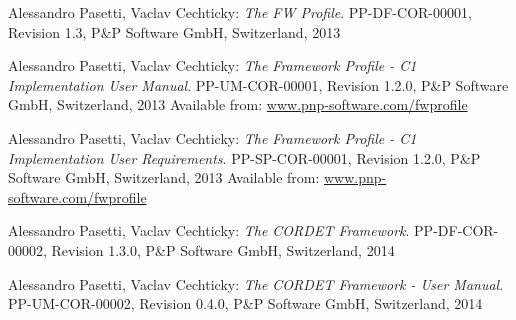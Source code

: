 \documentclass[a4paper,10pt]{article}
\begin{document}
\clearpage

\begin{thebibliography}{6}
 
 Alessandro Pasetti, Vaclav Cechticky:
           {\sl The FW Profile}. PP-DF-COR-00001, Revision 1.3,
           P\&P Software GmbH, Switzerland, 2013 

 Alessandro Pasetti, Vaclav Cechticky:
           {\sl The Framework Profile - C1 Implementation User Manual}. 
           PP-UM-COR-00001, Revision 1.2.0,
           P\&P Software GmbH, Switzerland, 2013
		   Available from: \url{www.pnp-software.com/fwprofile}          
		   
 Alessandro Pasetti, Vaclav Cechticky:
           {\sl The Framework Profile - C1 Implementation User Requirements}. 
           PP-SP-COR-00001, Revision 1.2.0,
           P\&P Software GmbH, Switzerland, 2013
		   Available from: \url{www.pnp-software.com/fwprofile}          		     
           
 Alessandro Pasetti, Vaclav Cechticky:
           {\sl The CORDET Framework}. 
           PP-DF-COR-00002, Revision 1.3.0,
           P\&P Software GmbH, Switzerland, 2014   
           
 Alessandro Pasetti, Vaclav Cechticky:
           {\sl The CORDET Framework - User Manual}. 
           PP-UM-COR-00002, Revision 0.4.0,
           P\&P Software GmbH, Switzerland, 2014                  
           
\end{thebibliography}
\end{document}
